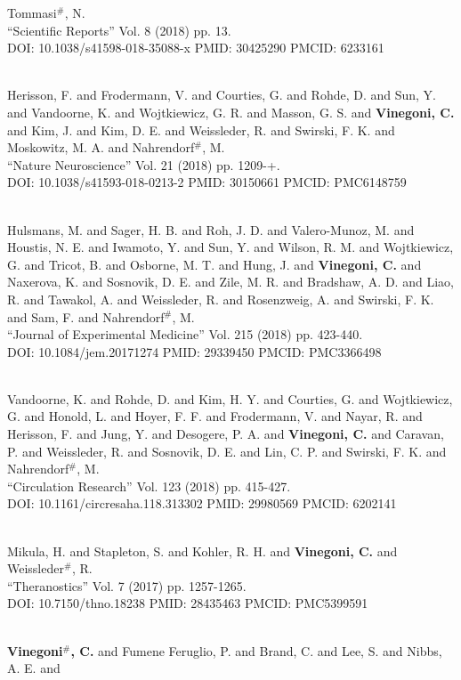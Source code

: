 Tommasi$^\#$, N. \\ ``Scientific Reports'' Vol. 8 (2018) pp. 13. \\ DOI: 10.1038/s41598-018-35088-x PMID: 30425290 PMCID: 6233161\item {} \\ Herisson, F. and Frodermann, V. and Courties, G. and Rohde, D. and Sun, Y. and Vandoorne, K. and Wojtkiewicz, G. R. and Masson, G. S. and {\bf Vinegoni, C.} and Kim, J. and Kim, D. E. and Weissleder, R. and Swirski, F. K. and Moskowitz, M. A. and Nahrendorf$^\#$, M. \\ ``Nature Neuroscience'' Vol. 21 (2018) pp. 1209-+. \\ DOI: 10.1038/s41593-018-0213-2 PMID: 30150661 PMCID: PMC6148759 \item {} \\ Hulsmans, M. and Sager, H. B. and Roh, J. D. and Valero-Munoz, M. and Houstis, N. E. and Iwamoto, Y. and Sun, Y. and Wilson, R. M. and Wojtkiewicz, G. and Tricot, B. and Osborne, M. T. and Hung, J. and {\bf Vinegoni, C.} and Naxerova, K. and Sosnovik, D. E. and Zile, M. R. and Bradshaw, A. D. and Liao, R. and Tawakol, A. and Weissleder, R. and Rosenzweig, A. and Swirski, F. K. and Sam, F. and Nahrendorf$^\#$, M. \\ ``Journal of Experimental Medicine'' Vol. 215 (2018) pp. 423-440. \\ DOI: 10.1084/jem.20171274 PMID: 29339450 PMCID: PMC3366498\item {} \\ Vandoorne, K. and Rohde, D. and Kim, H. Y. and Courties, G. and Wojtkiewicz, G. and Honold, L. and Hoyer, F. F. and Frodermann, V. and Nayar, R. and Herisson, F. and Jung, Y. and Desogere, P. A. and {\bf Vinegoni, C.} and Caravan, P. and Weissleder, R. and Sosnovik, D. E. and Lin, C. P. and Swirski, F. K. and Nahrendorf$^\#$, M. \\ ``Circulation Research'' Vol. 123 (2018) pp. 415-427. \\ DOI: 10.1161/circresaha.118.313302 PMID: 29980569 PMCID: 6202141\item {} \\ Mikula, H. and Stapleton, S. and Kohler, R. H. and {\bf Vinegoni, C.} and Weissleder$^\#$, R. \\ ``Theranostics'' Vol. 7 (2017) pp. 1257-1265. \\ DOI: 10.7150/thno.18238 PMID: 28435463 PMCID: PMC5399591\item {} \\ {\bf Vinegoni$^\#$, C.} and Fumene Feruglio, P. and Brand, C. and Lee, S. and Nibbs, A. E. and 